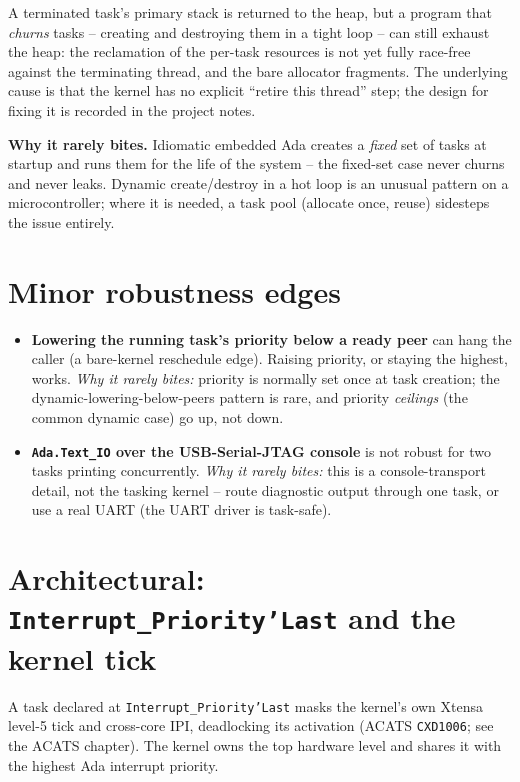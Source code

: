 A terminated task's primary stack is returned to the heap, but a program that
\emph{churns} tasks -- creating and destroying them in a tight loop -- can still
exhaust the heap: the reclamation of the per-task resources is not yet fully
race-free against the terminating thread, and the bare allocator fragments. The
underlying cause is that the kernel has no explicit ``retire this thread'' step;
the design for fixing it is recorded in the project notes.

\textbf{Why it rarely bites.} Idiomatic embedded Ada creates a \emph{fixed} set
of tasks at startup and runs them for the life of the system -- the fixed-set
case never churns and never leaks. Dynamic create/destroy in a hot loop is an
unusual pattern on a microcontroller; where it is needed, a task pool (allocate
once, reuse) sidesteps the issue entirely.

\section{Minor robustness edges}

\begin{itemize}
  \item \textbf{Lowering the running task's priority below a ready peer} can hang
        the caller (a bare-kernel reschedule edge). Raising priority, or staying
        the highest, works. \emph{Why it rarely bites:} priority is normally set
        once at task creation; the dynamic-lowering-below-peers pattern is rare,
        and priority \emph{ceilings} (the common dynamic case) go up, not down.
  \item \textbf{\texttt{Ada.Text\_IO} over the USB-Serial-JTAG console} is not
        robust for two tasks printing concurrently. \emph{Why it rarely bites:}
        this is a console-transport detail, not the tasking kernel -- route
        diagnostic output through one task, or use a real UART (the UART driver
        is task-safe).
\end{itemize}

\section{Architectural: \texttt{Interrupt\_Priority'Last} and the kernel tick}

A task declared at \texttt{Interrupt\_Priority'Last} masks the kernel's own
Xtensa level-5 tick and cross-core IPI, deadlocking its activation (ACATS
\texttt{CXD1006}; see the ACATS chapter). The kernel owns the top hardware level
and shares it with the highest Ada interrupt priority.

